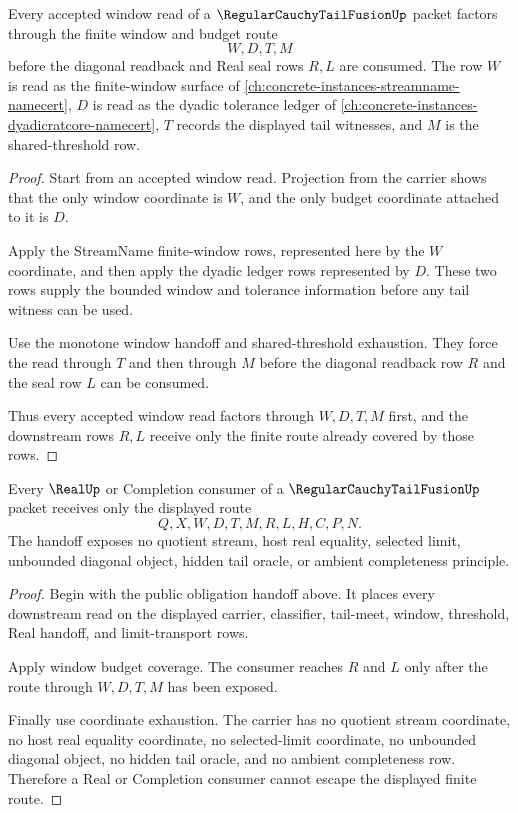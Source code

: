 \begin{theorem}
\label{thm:regular-cauchy-tail-fusion-window-budget-coverage}
Every accepted window read of a $\RegularCauchyTailFusionUp$ packet factors through the finite window and budget route
$$
W,D,T,M
$$
before the diagonal readback and Real seal rows $R,L$ are consumed. The row $W$ is read as the finite-window surface of \autoref{ch:concrete-instances-streamname-namecert}, $D$ is read as the dyadic tolerance ledger of \autoref{ch:concrete-instances-dyadicratcore-namecert}, $T$ records the displayed tail witnesses, and $M$ is the shared-threshold row.
\end{theorem}
\begin{proof}
Start from an accepted window read. Projection from the carrier shows that the only window coordinate is $W$, and the only budget coordinate attached to it is $D$.

Apply the StreamName finite-window rows, represented here by the $W$ coordinate, and then apply the dyadic ledger rows represented by $D$. These two rows supply the bounded window and tolerance information before any tail witness can be used.

Use the monotone window handoff and shared-threshold exhaustion. They force the read through $T$ and then through $M$ before the diagonal readback row $R$ and the seal row $L$ can be consumed.

Thus every accepted window read factors through $W,D,T,M$ first, and the downstream rows $R,L$ receive only the finite route already covered by those rows.
\end{proof}

\begin{theorem}
\label{thm:regular-cauchy-tail-fusion-real-seal-nonescape}
Every $\RealUp$ or Completion consumer of a $\RegularCauchyTailFusionUp$ packet receives only the displayed route
$$
Q,X,W,D,T,M,R,L,H,C,P,N.
$$
The handoff exposes no quotient stream, host real equality, selected limit, unbounded diagonal object, hidden tail oracle, or ambient completeness principle.
\end{theorem}
\begin{proof}
Begin with the public obligation handoff above. It places every downstream read on the displayed carrier, classifier, tail-meet, window, threshold, Real handoff, and limit-transport rows.

Apply window budget coverage. The consumer reaches $R$ and $L$ only after the route through $W,D,T,M$ has been exposed.

Finally use coordinate exhaustion. The carrier has no quotient stream coordinate, no host real equality coordinate, no selected-limit coordinate, no unbounded diagonal object, no hidden tail oracle, and no ambient completeness row. Therefore a Real or Completion consumer cannot escape the displayed finite route.
\end{proof}

